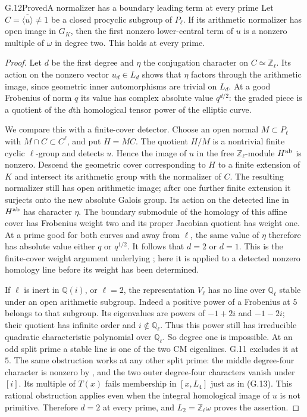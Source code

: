 \begin{statement}{G.12}{Proved}{A normalizer has a boundary leading term at every prime}
Let $C=\overline{\langle u\rangle}\ne1$ be a closed procyclic
subgroup of $P_\ell$. If its arithmetic normalizer has open image
in $G_K$, then the first nonzero lower-central term of $u$ is a
nonzero multiple of $\omega$ in degree two. This holds at every prime.
\end{statement}
\begin{proof}
Let $d$ be the first degree and $\eta$ the conjugation character
on $C\simeq\mathbb Z_\ell$. Its action on the nonzero vector
$u_d\in L_d$ shows that $\eta$ factors through the arithmetic
image, since geometric inner automorphisms are trivial on $L_d$.
At a good Frobenius of norm $q$ its value has complex absolute
value $q^{d/2}$: the graded piece is a quotient of the $d$th
homological tensor power of the elliptic curve.

We compare this with a finite-cover detector. Choose an open normal
$M\subset P_\ell$ with $M\cap C\subset C^\ell$, and put $H=MC$.
The quotient $H/M$ is a nontrivial finite cyclic $\ell$-group
and detects $u$. Hence the image of $u$ in the free
$\mathbb Z_\ell$-module $H^{\rm ab}$ is nonzero. Descend the
geometric cover corresponding to $H$ to a finite extension of $K$
and intersect its arithmetic group with the normalizer of $C$.
The resulting normalizer still has open arithmetic image; after
one further finite extension it surjects onto the new absolute
Galois group. Its action on the detected line in $H^{\rm ab}$
has character $\eta$. The boundary submodule of the homology
of this affine cover has Frobenius weight two and its proper
Jacobian quotient has weight one. At a prime good for both
curves and away from $\ell$, the same value of $\eta$ therefore
has absolute value either $q$ or $q^{1/2}$. It follows that
$d=2$ or $d=1$. This is the finite-cover weight argument underlying
\citet[Lemma 2.1.4 and proof of Theorem 2.1.1]{Nakamura1994};
here it is applied to a detected nonzero homology line before
its weight has been determined.

If $\ell$ is inert in $\mathbb Q(i)$, or $\ell=2$, the representation
$V_\ell$ has no line over $\mathbb Q_\ell$ stable under an open
arithmetic subgroup. Indeed a positive power of a Frobenius at $5$
belongs to that subgroup. Its eigenvalues are powers of
$-1+2i$ and $-1-2i$; their quotient has infinite order and
$i\notin\mathbb Q_\ell$. Thus this power still has irreducible
quadratic characteristic polynomial over $\mathbb Q_\ell$.
So degree one is impossible. At an odd split prime a stable
line is one of the two CM eigenlines. G.11 excludes it at $5$.
The same obstruction works at any other split prime: the
middle degree-four character is nonzero by
\citet[Corollary 4.10]{Ishii2025}, and the two outer degree-four
characters vanish under $[i]$. Its multiple of $T(x)$ fails
membership in $[x,L_4]$ just as in (G.13). This rational
obstruction applies even when the integral homological image
of $u$ is not primitive. Therefore $d=2$ at every prime,
and $L_2=\mathbb Z_\ell\omega$ proves the assertion.
\end{proof}

